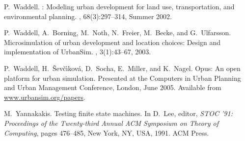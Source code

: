 \documentclass{sig-alternate}
\begin{document}
\begin{thebibliography}{10}
P.~Waddell.
: Modeling urban development for land use, transportation,
  and environmental planning.
, 68(3):297--314,
  Summer 2002.

P.~Waddell, A.~Borning, M.~Noth, N.~Freier, M.~Becke, and G.~Ulfarsson.
\newblock Microsimulation of urban development and location choices: Design and
  implementation of {UrbanSim}.
, 3(1):43--67, 2003.

P.~Waddell, H.~{\v{S}}ev\v{c}\'{\i}kov\'{a}, D.~Socha, E.~Miller, and K.~Nagel.
\newblock Opus: An open platform for urban simulation.
\newblock Presented at the Computers in Urban Planning and Urban Management
  Conference, London, June 2005.
\newblock Available from \url{www.urbansim.org/papers}.

M.~Yannakakis.
\newblock Testing finite state machines.
\newblock In D.~Lee, editor, {\em STOC '91: Proceedings of the Twenty-third
  Annual ACM Symposium on Theory of Computing}, pages 476--485, New York, NY,
  USA, 1991. ACM Press.

\end{thebibliography}
 
\end{document}
